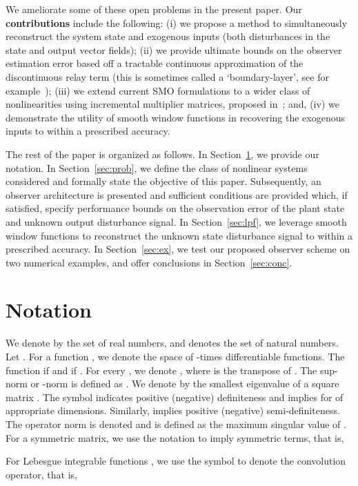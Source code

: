 \documentclass[times, doublespace]{rncauth}
\newcommand\ignore[1]{{}}
\begin{document}
We ameliorate some of these open problems in the present paper. Our \textbf{contributions} include the following: (i) we propose a method to simultaneously reconstruct the system state and exogenous inputs (both disturbances in the state and output vector fields); (ii) we provide ultimate bounds on the observer estimation error based off a tractable continuous approximation of the discontinuous relay term (this is sometimes called a `boundary-layer', see for example~\cite{Chouinard1985, Barmish1983, Corless1981, Zak_txtbk}); (iii) we extend current SMO formulations to a wider class of nonlinearities using incremental multiplier matrices, proposed in~\cite{iqs_corless}; and, (iv) we demonstrate the utility of smooth window functions in recovering the exogenous inputs to within a prescribed accuracy.

The rest of the paper is organized as follows. In Section~\ref{sec:notation}, we provide our notation. In Section~\ref{sec:prob}, we define the class of nonlinear systems considered and formally state the objective of this paper. Subsequently, an observer architecture is presented and sufficient conditions are provided which, if satisfied, specify performance bounds on the observation error of the plant state and unknown output disturbance signal. In Section~\ref{sec:lpf}, we leverage smooth window functions to reconstruct the unknown state disturbance signal to within a prescribed accuracy. In Section~\ref{sec:ex}, we test our proposed observer scheme on two numerical examples, and offer conclusions in Section~\ref{sec:conc}.

\ignore{}
\section{Notation}\label{sec:notation}
We denote by  the set of real numbers, and  denotes the set of natural numbers. Let . For a function , we denote  the space of -times differentiable functions. The function  if  and  if .
For every , we denote , where  is the transpose of . The sup-norm or -norm is defined as . We denote by  the smallest eigenvalue of a square matrix . The symbol  indicates positive (negative) definiteness and  implies  for  of appropriate dimensions. Similarly,  implies positive (negative) semi-definiteness. The operator norm is denoted  and is defined as the maximum singular value of . For a symmetric matrix, we use the  notation to imply symmetric terms, that is,
 
For Lebesgue integrable functions , we use the symbol  to denote the convolution operator, that is,
\end{document}

